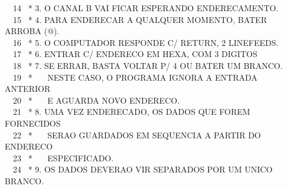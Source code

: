 \documentclass[a4paper,12pt]{article}
\begin{document}
\phantom \ \ 14 \ * 3. O CANAL B VAI FICAR ESPERANDO ENDERECAMENTO.\\
\phantom \ \ 15 \ * 4. PARA ENDERECAR A QUALQUER MOMENTO, BATER ARROBA (@).\\
\phantom \ \ 16 \ * 5. O COMPUTADOR RESPONDE C/ RETURN, 2 LINEFEEDS.\\
\phantom \ \ 17 \ * 6. ENTRAR C/ ENDERECO EM HEXA, COM 3 DIGITOS\\
\phantom \ \ 18 \ * 7. SE ERRAR, BASTA VOLTAR P/ 4 OU BATER UM BRANCO.\\
\phantom \ \ 19 \ * \ \ \ NESTE CASO, O PROGRAMA IGNORA A ENTRADA ANTERIOR\\
\phantom \ \ 20 \ * \ \ \ E AGUARDA NOVO ENDERECO.\\
\phantom \ \ 21 \ * 8. UMA VEZ ENDERECADO, OS DADOS QUE FOREM FORNECIDOS\\
\phantom \ \ 22 \ * \ \ \ SERAO GUARDADOS EM SEQUENCIA A PARTIR DO ENDERECO\\
\phantom \ \ 23 \ * \ \ \ ESPECIFICADO.\\
\phantom \ \ 24 \ * 9. OS DADOS DEVERAO VIR SEPARADOS POR UM UNICO BRANCO.

\newpage

\noindent \\
\end{document}
